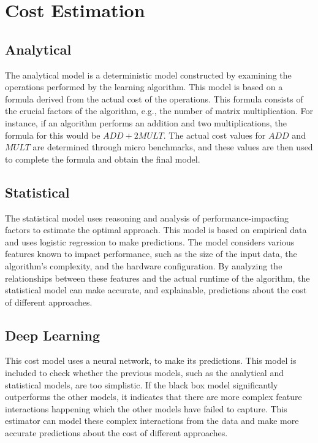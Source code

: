 \section{Cost Estimation}
\label{sec:4-cost-estimation}

\subsection{Analytical}
The analytical model is a deterministic model constructed by examining the operations performed by the learning algorithm. This model is based on a formula derived from the actual cost of the operations. This formula consists of the crucial factors of the algorithm, e.g., the number of matrix multiplication. For instance, if an algorithm performs an addition and two multiplications, the formula for this would be $ADD + 2MULT$. The actual cost values for $ADD$ and $MULT$ are determined through micro benchmarks, and these values are then used to complete the formula and obtain the final model.

\subsection{Statistical}
The statistical model uses reasoning and analysis of performance-impacting factors to estimate the optimal approach. This model is based on empirical data and uses logistic regression to make predictions. The model considers various features known to impact performance, such as the size of the input data, the algorithm's complexity, and the hardware configuration. By analyzing the relationships between these features and the actual runtime of the algorithm, the statistical model can make accurate, and explainable, predictions about the cost of different approaches.

\subsection{Deep Learning}
This cost model uses a neural network, to make its predictions. This model is included to check whether the previous models, such as the analytical and statistical models, are too simplistic. If the black box model significantly outperforms the other models, it indicates that there are more complex feature interactions happening which the other models have failed to capture. This estimator can model these complex interactions from the data and make more accurate predictions about the cost of different approaches.

